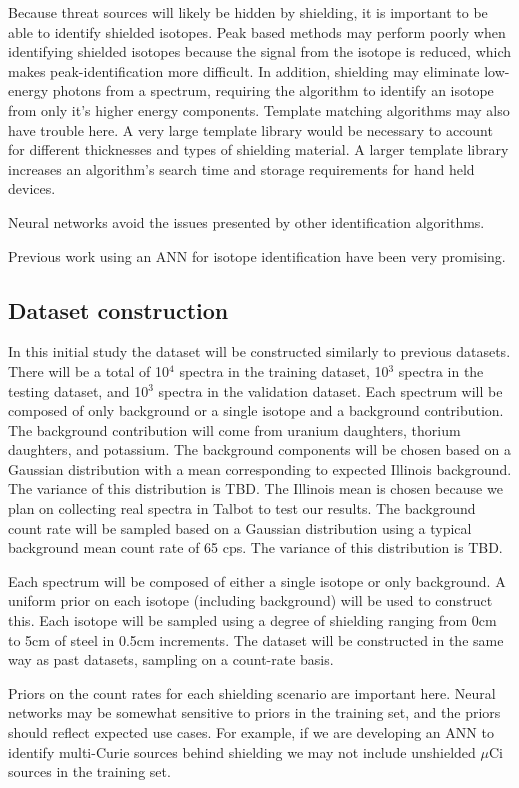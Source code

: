 \documentclass[thesis,tocnosub,noragright,centerchapter,12pt,fullpage]{uiucecethesis09}
\begin{document}
Because threat sources will likely be hidden by shielding, it is important to be able to identify shielded isotopes. Peak based methods may perform poorly when identifying shielded isotopes because the signal from the isotope is reduced, which makes peak-identification more difficult. In addition, shielding may eliminate low-energy photons from a spectrum, requiring the algorithm to identify an isotope from only it's higher energy components. Template matching algorithms may also have trouble here. A very large template library would be necessary to account for different thicknesses and types of shielding material. A larger template library increases an algorithm's search time and storage requirements for hand held devices.  

Neural networks avoid the issues presented by other identification algorithms. 

Previous work using an ANN for isotope identification have been very promising.

\subsection{Dataset construction}

In this initial study the dataset will be constructed similarly to previous datasets. There will be a total of 10$^{4}$ spectra in the training dataset, 10$^{3}$ spectra in the testing dataset, and 10$^{3}$ spectra in the validation dataset. Each spectrum will be composed of only background or  a single isotope and a background contribution. The background contribution will come from uranium daughters, thorium daughters, and potassium. The background components will be chosen based on a Gaussian distribution with a mean corresponding to expected Illinois background. The variance of this distribution is TBD. The Illinois mean is chosen because we plan on collecting real spectra in Talbot to test our results. The background count rate will be sampled based on a Gaussian distribution using a typical background mean count rate of 65 cps. The variance of this distribution is TBD. 

Each spectrum will be composed of either a single isotope or only background. A uniform prior on each isotope (including background) will be used to construct this. Each isotope will be sampled using a degree of shielding ranging from 0cm to 5cm of steel in 0.5cm increments. The dataset will be constructed in the same way as past datasets, sampling on a count-rate basis.

Priors on the count rates for each shielding scenario are important here. Neural networks may be somewhat sensitive to priors in the training set, and the priors should reflect expected use cases. For example, if we  are developing an ANN to identify multi-Curie sources behind shielding we may not include unshielded $\mu$Ci sources in the training set.
\end{document}
